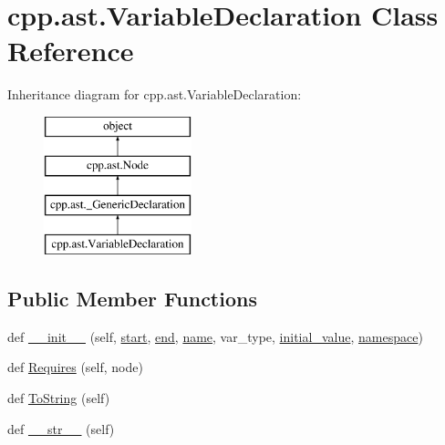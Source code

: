 \hypertarget{classcpp_1_1ast_1_1_variable_declaration}{}\section{cpp.\+ast.\+Variable\+Declaration Class Reference}
\label{classcpp_1_1ast_1_1_variable_declaration}
Inheritance diagram for cpp.\+ast.\+Variable\+Declaration\+:\begin{figure}[H]
\begin{center}
\leavevmode
\includegraphics[height=4.000000cm]{d1/db4/classcpp_1_1ast_1_1_variable_declaration}
\end{center}
\end{figure}
\subsection*{Public Member Functions}
\begin{DoxyCompactItemize}
\item 
def \mbox{\hyperlink{classcpp_1_1ast_1_1_variable_declaration_adc19909b6a3b2c2978b02044634fc13f}{\+\_\+\+\_\+init\+\_\+\+\_\+}} (self, \mbox{\hyperlink{classcpp_1_1ast_1_1_node_a7b2aa97e6a049bb1a93aea48c48f1f44}{start}}, \mbox{\hyperlink{classcpp_1_1ast_1_1_node_a3c5e5246ccf619df28eca02e29d69647}{end}}, \mbox{\hyperlink{classcpp_1_1ast_1_1___generic_declaration_af774f4729dfd78d0538a6782fe8514c1}{name}}, var\+\_\+type, \mbox{\hyperlink{classcpp_1_1ast_1_1_variable_declaration_a7c259ca42a06e264679e8ab66e7ea374}{initial\+\_\+value}}, \mbox{\hyperlink{classcpp_1_1ast_1_1___generic_declaration_a8aee3f11b37449d54b42a78e0a689f46}{namespace}})
\item 
def \mbox{\hyperlink{classcpp_1_1ast_1_1_variable_declaration_aaa1cae7cf191e6d561d861cd053a0bf4}{Requires}} (self, node)
\item 
def \mbox{\hyperlink{classcpp_1_1ast_1_1_variable_declaration_a047aa4afddf7b7823a4095cea9477a21}{To\+String}} (self)
\item 
def \mbox{\hyperlink{classcpp_1_1ast_1_1_variable_declaration_a9f5c15731d1bdd8fe14c2a575e2f4fe6}{\+\_\+\+\_\+str\+\_\+\+\_\+}} (self)
\end{DoxyCompactItemize}
